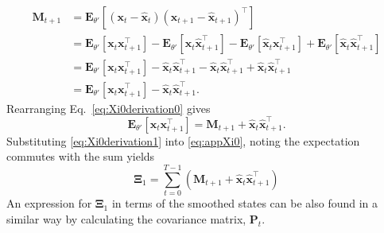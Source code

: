 \documentclass[review,authoryear,3p]{elsarticle}
\begin{document}
\begin{align}\label{eq:Xi0derivation0} 
 \mathbf M_{t+1}&=\mathbf E_{\theta'}\left[(\mathbf x_t-\mathbf{\hat x}_t)(\mathbf x_{t+1}-\mathbf{\hat x}_{t+1})^\top\right] \nonumber \\
&=\mathbf E_{\theta'}\left[\mathbf x_t\mathbf x_{t+1}^\top\right]-\mathbf E_{\theta'}\left[\mathbf x_t\hat{\mathbf x}_{t+1}^\top\right]-\mathbf E_{\theta'}\left[\hat{\mathbf x}_t\mathbf x_{t+1}^\top\right]+\mathbf E_{\theta'}\left[\hat{\mathbf x}_t\hat{\mathbf x}_{t+1}^\top\right]  \nonumber \\
&= \mathbf E_{\theta'}\left[\mathbf x_t\mathbf x_{t+1}^\top\right]-\hat{\mathbf x}_t\hat{\mathbf x}_{t+1}^\top-\hat{\mathbf x}_t\hat{\mathbf x}_{t+1}^\top+\hat{\mathbf x}_t\hat{\mathbf x}_{t+1}^\top\nonumber \\
&= \mathbf E_{\theta'}\left[\mathbf x_t\mathbf x_{t+1}^\top\right]-\hat{\mathbf x}_t\hat{\mathbf x}_{t+1}^\top.
\end{align}
Rearranging   Eq.~\eqref{eq:Xi0derivation0} gives
\begin{equation}\label{eq:Xi0derivation1}
 \mathbf E_{\theta'}\left[\mathbf x_t\mathbf x_{t+1}^\top\right]=\mathbf M_{t+1}+\mathbf {\hat x}_t\mathbf{\hat x}_{t+1}^\top.
\end{equation}
Substituting \ref{eq:Xi0derivation1} into \ref{eq:appXi0}, noting the expectation commutes with the sum yields
\begin{equation}
 \boldsymbol\Xi_1=\sum_{t=0}^{T-1}\left(\mathbf M_{t+1}+\mathbf{\hat x}_t\mathbf{\hat x}_{t+1}^\top\right)
\end{equation}   
An expression for $\boldsymbol\Xi_1$ in terms of the smoothed states can be also found in a similar way by calculating the covariance matrix, $\mathbf P_t$.
\newpage
  

\end{document}
